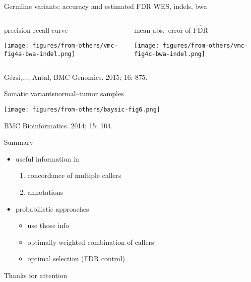 \documentclass{beamer} %
\begin{document}

\begin{frame}{Germline variants: accuracy and estimated FDR}
{WES, indels, bwa}
\begin{columns}[t]
\begin{column}{0.7\textwidth}
precision-recall curve
\bigskip

\texttt{[image: figures/from-others/vmc-fig4a-bwa-indel.png]}
\end{column}

\begin{column}{0.35\textwidth}
mean abs.~error of \(\widehat{\text{FDR}}\)
\bigskip

\texttt{[image: figures/from-others/vmc-fig4c-bwa-indel.png]}
\end{column}
\end{columns}

\bigskip
\begin{center}
{\footnotesize G\'{e}zsi,..., Antal, BMC Genomics. 2015; 16: 875.}
\end{center}
\end{frame}

\begin{frame}{Somatic variants}{normal--tumor samples}
\begin{center}
\texttt{[image: figures/from-others/baysic-fig6.png]}
\end{center}
\bigskip

{\footnotesize BMC Bioinformatics. 2014; 15: 104.}
\end{frame}

\begin{frame}{Summary}
\begin{itemize}
\item useful information in
\begin{enumerate}
\item concordance of multiple callers
\item annotations 
\end{enumerate}
\item probabilistic approaches
\begin{itemize}
\item use those info
\item optimally weighted combination of callers
\item optimal selection (FDR control)
\end{itemize} 
\end{itemize}
\bigskip

\begin{center}
\Large Thanks for attention
\end{center}
\end{frame}
\end{document}
